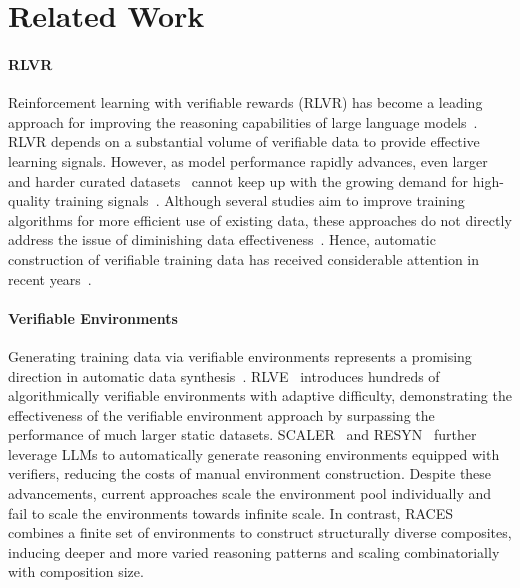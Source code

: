 \section{Related Work}
\paragraph{RLVR}
Reinforcement learning with verifiable rewards (RLVR) has become a leading approach for improving the reasoning capabilities of large language models~\citep{Guo2025, shao2024deepseekmathpushinglimitsmathematical, liu2025understanding}.
RLVR depends on a substantial volume of verifiable data to provide effective learning signals.
However, as model performance rapidly advances, even larger and harder curated datasets~\citep{he2026deepmathk} cannot keep up with the growing demand for high-quality training signals~\citep{villalobos2024position}.
Although several studies aim to improve training algorithms for more efficient use of existing data, these approaches do not directly address the issue of diminishing data effectiveness~\citep{zhu2025the, yue2025vapoefficientreliablereinforcement, wang2025reinforcement}.
Hence, automatic construction of verifiable training data has received considerable attention in recent years~\citep{zhao2025absolutezeroreinforcedselfplay, huang2026rzero, liang2026beyond}.

\paragraph{Verifiable Environments}
Generating training data via verifiable environments represents a promising direction in automatic data synthesis~\citep{jiang-etal-2025-logicpro}.
RLVE~\citep{zeng2025rlvescalingreinforcementlearning} introduces hundreds of algorithmically verifiable environments with adaptive difficulty, demonstrating the effectiveness of the verifiable environment approach by surpassing the performance of much larger static datasets.
SCALER~\citep{xu2026scalersyntheticscalableadaptivelearning} and RESYN~\citep{he2026resyn} further leverage LLMs to automatically generate reasoning environments equipped with verifiers, reducing the costs of manual environment construction.
Despite these advancements, current approaches scale the environment pool individually and fail to scale the environments towards infinite scale.
In contrast, RACES combines a finite set of environments to construct structurally diverse composites, inducing deeper and more varied reasoning patterns and scaling combinatorially with composition size.

